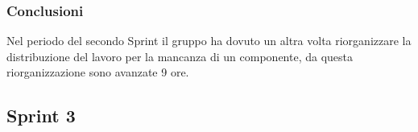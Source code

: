 \subsubsection{Conclusioni}
Nel periodo del secondo Sprint il gruppo ha dovuto un altra volta riorganizzare la distribuzione del lavoro per la mancanza di un componente, da questa riorganizzazione sono avanzate 9 ore.
\subsection{Sprint 3}
\label{sec:sprint_3}
